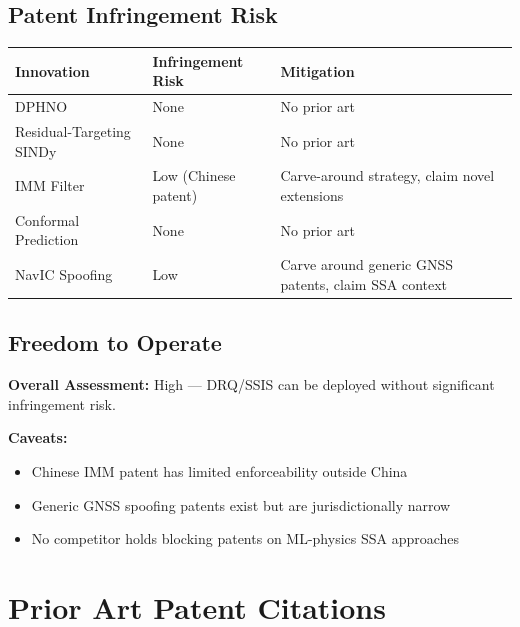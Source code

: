 \documentclass[11pt,a4paper]{article}
\begin{document}
\subsection{Patent Infringement Risk}

\renewcommand{\arraystretch}{1.3}
\begin{tabularx}{\textwidth}{l Y Y}
\toprule
\textbf{Innovation} & \textbf{Infringement Risk} & \textbf{Mitigation} \\
\midrule
DPHNO & None & No prior art \\
Residual-Targeting SINDy & None & No prior art \\
IMM Filter & Low (Chinese patent) & Carve-around strategy, claim novel extensions \\
Conformal Prediction & None & No prior art \\
NavIC Spoofing & Low & Carve around generic GNSS patents, claim SSA context \\
\bottomrule
\end{tabularx}

\subsection{Freedom to Operate}

\textbf{Overall Assessment:} High — DRQ/SSIS can be deployed without significant infringement risk.

\textbf{Caveats:}
\begin{itemize}
\item Chinese IMM patent has limited enforceability outside China
\item Generic GNSS spoofing patents exist but are jurisdictionally narrow
\item No competitor holds blocking patents on ML-physics SSA approaches
\end{itemize}

\newpage

\section{Prior Art Patent Citations}
\end{document}

